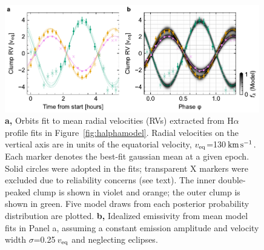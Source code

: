\documentclass[11pt,twocolumn,tighten,linenumbers]{aastex7}
\newcommand{\kms}{\ensuremath{\rm km\,s^{-1}}}
\begin{document}
\begin{figure}[!t]
  \centering
  \includegraphics[width=0.99\textwidth]{f7.pdf}
  \caption{{\bf a,} Orbits fit to mean radial velocities (RVs)
  extracted from H$\alpha$ profile fits in
  Figure~\ref{fig:halphamodel}.  Radial velocities on the vertical
  axis are in units of the equatorial velocity, $v_{\rm
  eq}$=130\,\kms.  Each marker denotes the best-fit gaussian mean at a
  given epoch.  Solid circles were adopted in the fits; transparent X
  markers were excluded due to reliability concerns (see text).  The
  inner double-peaked clump is shown in violet and orange; the outer
  clump is shown in green.  Five model draws from each posterior
  probability distribution are plotted.  {\bf b,} Idealized emissivity
  from mean model fits in Panel a, assuming a constant emission
  amplitude and velocity width $\sigma$=0.25\,$v_{\rm eq}$ and
  neglecting eclipses.}
  \label{fig:orbits}
\end{figure}
\end{document}
